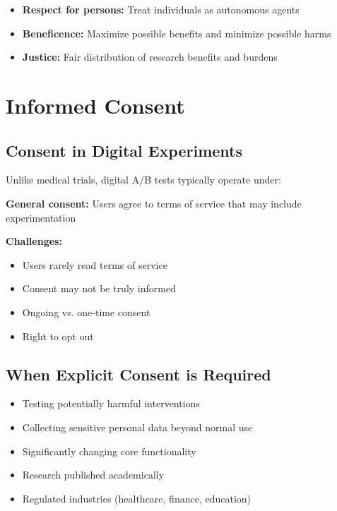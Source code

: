 \begin{itemize}
    \item \textbf{Respect for persons:} Treat individuals as autonomous agents

    \item \textbf{Beneficence:} Maximize possible benefits and minimize possible harms

    \item \textbf{Justice:} Fair distribution of research benefits and burdens
\end{itemize}

\section{Informed Consent}

\subsection{Consent in Digital Experiments}

Unlike medical trials, digital A/B tests typically operate under:

\textbf{General consent:} Users agree to terms of service that may include experimentation

\textbf{Challenges:}
\begin{itemize}
    \item Users rarely read terms of service
    \item Consent may not be truly informed
    \item Ongoing vs. one-time consent
    \item Right to opt out
\end{itemize}

\subsection{When Explicit Consent is Required}

\begin{itemize}
    \item Testing potentially harmful interventions
    \item Collecting sensitive personal data beyond normal use
    \item Significantly changing core functionality
    \item Research published academically
    \item Regulated industries (healthcare, finance, education)
\end{itemize}

